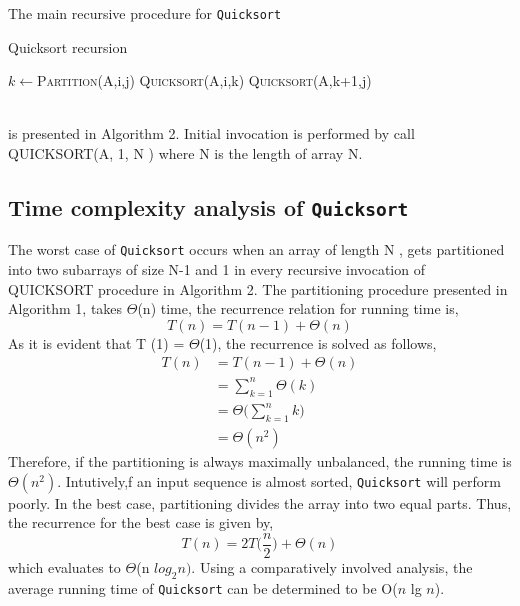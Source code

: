 \documentclass[a4paper,10pt,twocolumn]{article}
\begin{document}
\indent The main recursive procedure for \texttt{Quicksort} 
\begin{algorithm}
\caption{Quicksort recursion}
\begin{algorithmic}[1]
  \newline
        \State $k  \leftarrow$\textsc{Partition}(A,i,j)
        \State \textsc{Quicksort}(A,i,k)
        \State \textsc{Quicksort}(A,k+1,j)
        \EndIf
    \EndProcedure
\end{algorithmic}
\end{algorithm}\\
is presented in Algorithm 2. Initial invocation is performed by call QUICKSORT(A, 1, N ) where N is the length of array N.
\subsection{Time complexity analysis of \texttt{Quicksort}}
The worst case of \texttt{Quicksort} occurs when an array of length N , gets partitioned into two subarrays of size N-1 and 1 in every recursive invocation of QUICKSORT procedure in Algorithm 2. The partitioning procedure presented in Algorithm 1, takes $\Theta$(n) time, the recurrence relation for running time
is,
\begin{equation*}
    T(n)=T(n-1)+\Theta(n)
\end{equation*}
As it is evident that T (1) = $\Theta$(1), the recurrence is solved as follows,
\begin{align*}
T(n)& =T(n-1)+\Theta(n)\\
& =\sum_{k=1}^{n} \Theta(k)        \\ 
& =\Theta \Bigg (\sum_{k=1}^{n} k \Bigg )\\
& =\Theta (n^2)
\end{align*}
\indent Therefore, if the partitioning is always maximally unbalanced, the running time is $\Theta(n^2)$. Intutively,f an input sequence is almost sorted, \texttt{Quicksort} will perform poorly. In the best case, partitioning divides the array into two equal parts. Thus, the recurrence for the best case is given by,
\begin{equation*}
    T(n)=2T\bigg(\frac{n}{2}\bigg)+\Theta(n)
\end{equation*}
which evaluates to $\Theta$(n $log_2 n)$. Using a comparatively involved analysis, the average running time of \texttt{Quicksort} can be determined to be O($n$ lg $n$).
\newpage
\end{document}

